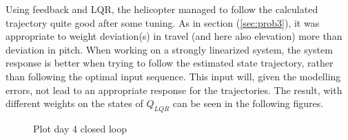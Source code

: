Using feedback and LQR, the helicopter managed to follow the calculated trajectory quite good after some tuning. As in section (\ref{sec:prob3}), it was appropriate to weight deviation(s) in travel (and here also elevation) more than deviation in pitch.
When working on a strongly linearized system, the system response is better when trying to follow the estimated state trajectory, rather than following the optimal input sequence. This input will, given the modelling errors, not lead to an appropriate response for the trajectories. The result, with different weights on the states of $Q_{LQR}$ can be seen in the following figures.
\begin{figure}[ht!]
    \centering
    \caption{Plot day 4 closed loop}
    \label{fig:day4_cl_plot_allQ}
\end{figure}

